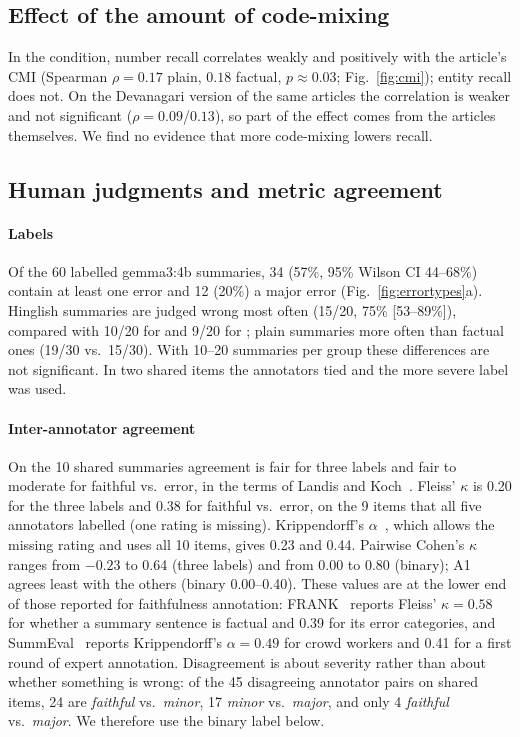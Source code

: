 \subsection{Effect of the amount of code-mixing}
In the  condition, number recall correlates weakly and positively with the article's CMI (Spearman $\rho = 0.17$ plain, $0.18$ factual, $p \approx 0.03$; Fig.~\ref{fig:cmi}); entity recall does not. On the Devanagari version of the same articles the correlation is weaker and not significant ($\rho = 0.09$/$0.13$), so part of the effect comes from the articles themselves. We find no evidence that more code-mixing lowers recall.

\subsection{Human judgments and metric agreement}
\label{sec:human}
\paragraph{Labels} Of the 60 labelled gemma3:4b summaries, 34 (57\%, 95\% Wilson CI 44--68\%) contain at least one error and 12 (20\%) a major error (Fig.~\ref{fig:errortypes}a). Hinglish summaries are judged wrong most often (15/20, 75\% [53--89\%]), compared with 10/20 for  and 9/20 for ; plain summaries more often than factual ones (19/30 vs.\ 15/30). With 10--20 summaries per group these differences are not significant. In two shared items the annotators tied and the more severe label was used.

\paragraph{Inter-annotator agreement} On the 10 shared summaries agreement is fair for three labels and fair to moderate for faithful vs.\ error, in the terms of Landis and Koch~\cite{landis1977measurement}. Fleiss' $\kappa$ is 0.20 for the three labels and 0.38 for faithful vs.\ error, on the 9 items that all five annotators labelled (one rating is missing). Krippendorff's $\alpha$~\cite{krippendorff2011computing}, which allows the missing rating and uses all 10 items, gives 0.23 and 0.44. Pairwise Cohen's $\kappa$ ranges from $-0.23$ to 0.64 (three labels) and from 0.00 to 0.80 (binary); A1 agrees least with the others (binary 0.00--0.40). These values are at the lower end of those reported for faithfulness annotation: FRANK~\cite{pagnoni2021frank} reports Fleiss' $\kappa = 0.58$ for whether a summary sentence is factual and 0.39 for its error categories, and SummEval~\cite{fabbri2021summeval} reports Krippendorff's $\alpha = 0.49$ for crowd workers and 0.41 for a first round of expert annotation. Disagreement is about severity rather than about whether something is wrong: of the 45 disagreeing annotator pairs on shared items, 24 are \emph{faithful} vs.\ \emph{minor}, 17 \emph{minor} vs.\ \emph{major}, and only 4 \emph{faithful} vs.\ \emph{major}. We therefore use the binary label below.

